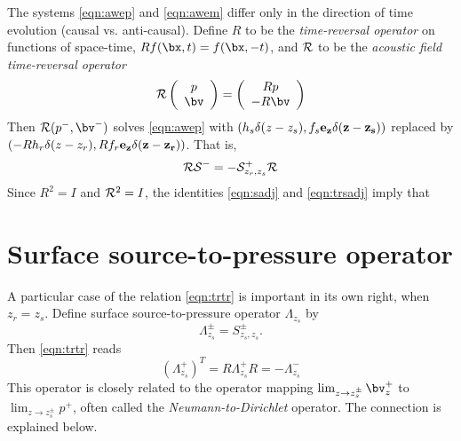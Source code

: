 The systems \ref{eqn:awep} and \ref{eqn:awem} differ only in the direction of time evolution (causal vs. anti-causal). Define $R$ to be the {\em time-reversal operator} on functions of space-time,
$Rf(\bx,t) = f(\bx,-t)$, and ${\cal R}$ to be the {\em acoustic field time-reversal operator} 
\begin{equation}
  \label{eqn:trdef}
  {\cal R} \left(
    \begin{array}{c}
      p\\
      \bv
    \end{array}
  \right) =
  \left(
    \begin{array}{c}
      Rp\\
      -R\bv
    \end{array}
  \right)
\end{equation}
Then ${\cal R}(p^-,\bv^-)$ solves \ref{eqn:awep} with
$(h_s\delta(z-z_s),f_s\bf{e_z}\delta(z-z_s))$ replaced by
$(-Rh_r\delta(z-z_r), Rf_r\bf{e_z}\delta(z-z_r))$. That is,
\begin{equation}
  \label{eqn:trsadj}
  {\cal R}{\cal S}^- = -{\cal S}^+_{z_r,z_s}{\cal R}
\end{equation}
Since $R^2 = I$ and ${\cal R}^2 = I$, the identities \ref{eqn:sadj} and \ref{eqn:trsadj} imply that

\section{Surface source-to-pressure operator}

A particular case of the relation \ref{eqn:trtr} is important in its own right, when $z_r=z_s$. Define surface source-to-pressure operator $\Lambda_{z_s}$ by
\begin{equation}
  \label{eqn:ntoddef}
  \Lambda^{\pm}_{z_s} = S^{\pm}_{z_s,z_s}.
\end{equation}
Then \ref{eqn:trtr} reads
\begin{equation}
  \label{eqn:ntodtr}
  (\Lambda^+_{z_s})^T = R\Lambda_{z_s}^+R = -\Lambda^-_{z_s}
\end{equation}
This operator is closely related to the operator mapping $\lim_{z\rightarrow z_s^{\pm}} \bv_z^+$ to $\lim_{z\rightarrow z_s^{\pm}}  p^+$, often called the {\em Neumann-to-Dirichlet} operator. The connection is explained below.

